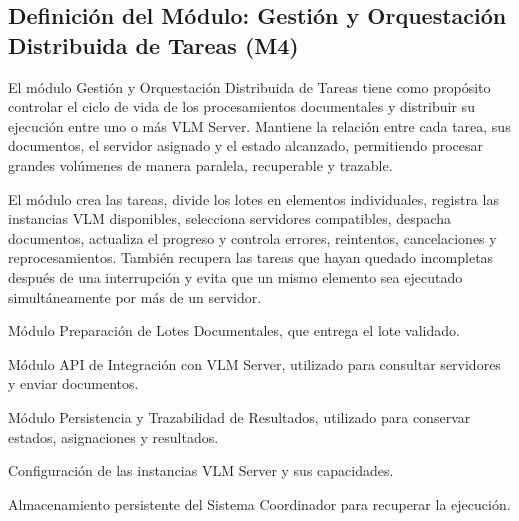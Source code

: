 
\subsection{Definición del Módulo: Gestión y Orquestación Distribuida de Tareas (M4)}
\label{subsec:modulo_m4}

\begin{definicionmodulo}

\item[Propósito] El módulo Gestión y Orquestación Distribuida de Tareas tiene como propósito controlar el ciclo de vida de los procesamientos documentales y distribuir su ejecución entre uno o más VLM Server. Mantiene la relación entre cada tarea, sus documentos, el servidor asignado y el estado alcanzado, permitiendo procesar grandes volúmenes de manera paralela, recuperable y trazable.

\item[Alcance] El módulo crea las tareas, divide los lotes en elementos individuales, registra las instancias VLM disponibles, selecciona servidores compatibles, despacha documentos, actualiza el progreso y controla errores, reintentos, cancelaciones y reprocesamientos. También recupera las tareas que hayan quedado incompletas después de una interrupción y evita que un mismo elemento sea ejecutado simultáneamente por más de un servidor.

\item[Dependencias]
\begin{elementosmodulo}
    \item Módulo Preparación de Lotes Documentales, que entrega el lote validado.
    \item Módulo API de Integración con VLM Server, utilizado para consultar servidores y enviar documentos.
    \item Módulo Persistencia y Trazabilidad de Resultados, utilizado para conservar estados, asignaciones y resultados.
    \item Configuración de las instancias VLM Server y sus capacidades.
    \item Almacenamiento persistente del Sistema Coordinador para recuperar la ejecución.
\end{elementosmodulo}


\end{definicionmodulo}
